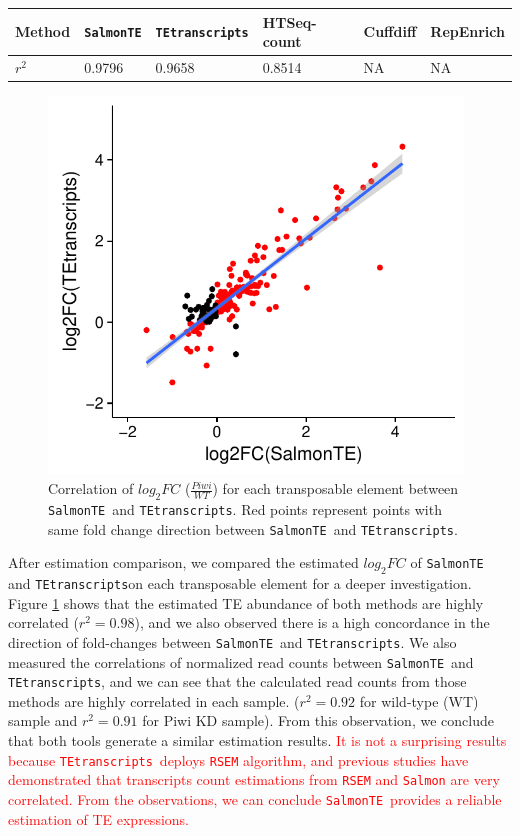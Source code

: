 \documentclass[wsdraft]{ws-procs11x85}
\newcommand{\TEtranscripts}{\texttt{TEtranscripts}}
\newcommand{\SalmonTE}{\texttt{SalmonTE}}
\begin{document}
\begin{table}[h]
\tbl{\textcolor{red}{Pearson Correlation between RT-qPCR and computational TE quantification methods.}}
{\begin{tabular}{l|lllll}
	\hline
	Method    & \SalmonTE & \TEtranscripts & HTSeq-count & Cuffdiff & RepEnrich  \\ \hline
	 $r^2$ & 0.9796 & 0.9658 & 0.8514 & NA & NA \\ \hline
\end{tabular}}\label{aba:table_corr}
\end{table}

\begin{figure}[h]
\centerline{
\includegraphics[width=11cm]{figure_corr_FC}
}
\caption{Correlation of $log_{2}FC$ ($\frac{Piwi}{WT}$) for each transposable element between \SalmonTE~and \TEtranscripts. Red points represent points with same fold change direction between \SalmonTE~and \TEtranscripts.}
\label{aba:fig2}
\end{figure}

After estimation comparison, we compared the estimated $log_{2}FC$ of \SalmonTE~ and \TEtranscripts on each transposable element for a deeper investigation. Figure \ref{aba:fig2} shows that the estimated TE abundance of both methods are highly correlated ($r^{2}=0.98$), and we also observed there is a high concordance in the direction of fold-changes between \SalmonTE~and \TEtranscripts. We also measured the correlations of normalized read counts between \SalmonTE~and \TEtranscripts, 
and we can see that the calculated read counts from those methods are highly correlated in each sample. ($r^2=0.92$ for wild-type (WT) sample and $r^2=0.91$ for Piwi KD sample).
From this observation, we conclude that both tools generate a similar estimation results. 
\textcolor{red}{
It is not a surprising results because \TEtranscripts~deploys \texttt{RSEM} algorithm,\cite{li2011rsem} and previous studies have demonstrated that transcripts count estimations from \texttt{RSEM} and \texttt{Salmon} are very correlated.\cite{jin2017comprehensive,zhang2017evaluation}
From the observations, we can conclude \SalmonTE~provides a reliable estimation of TE expressions.}
\end{document}
